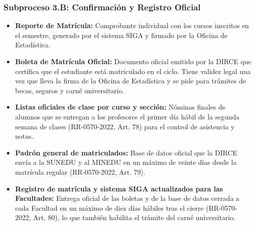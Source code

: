 \subsubsection{Subproceso 3.B: Confirmación y Registro Oficial}

\begin{itemize}
    \item \textbf{Reporte de Matrícula:} Comprobante individual con los cursos inscritos en el semestre, generado por el sistema SIGA y firmado por la Oficina de Estadística.

    \item \textbf{Boleta de Matrícula Oficial:} Documento oficial emitido por la DIRCE que certifica que el estudiante está matriculado en el ciclo. Tiene validez legal una vez que lleva la firma de la Oficina de Estadística y se pide para trámites de becas, seguros y carné universitario.

    \item \textbf{Listas oficiales de clase por curso y sección:} Nóminas finales de alumnos que se entregan a los profesores el primer día hábil de la segunda semana de clases (RR-0570-2022, Art. 78\textdegree{}) para el control de asistencia y notas.

    \item \textbf{Padrón general de matriculados:} Base de datos oficial que la DIRCE envía a la SUNEDU y al MINEDU en un máximo de veinte días desde la matrícula regular (RR-0570-2022, Art. 79\textdegree{}).

    \item \textbf{Registro de matrícula y sistema SIGA actualizados para las Facultades:} Entrega oficial de las boletas y de la base de datos cerrada a cada Facultad en un máximo de diez días hábiles tras el cierre (RR-0570-2022, Art. 80\textdegree{}), lo que también habilita el trámite del carné universitario.
\end{itemize}
